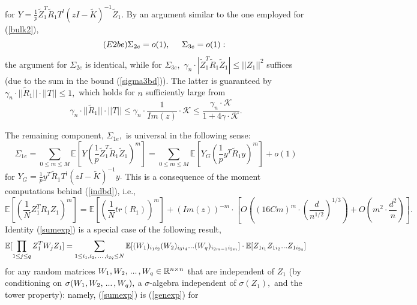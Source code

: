 \documentclass{article}
\numberwithin{equation}{section}
\begin{document}
for \(Y=\frac{1}{p}\tilde{Z}_1^T\tilde{R}_1T^l(zI-\tilde{K})^{-1}\tilde{Z}_1.\) %
By an argument similar to the one employed for (\ref{bulk2}), %
\begin{equation}\tag{\(E2be\)}\label{bulk2e}
    \Sigma_{2e}=o(1), \hspace{0.5cm} \Sigma_{3e}=o(1):
\end{equation}
the argument for \(\Sigma_{2e}\) is identical, while for \(\Sigma_{3e},\) 
\(\gamma_n \cdot |\tilde{Z}_1^T\tilde{R}_1\tilde{Z}_1| \leq ||Z_1||^2\) suffices (due to the sum in the bound (\ref{sigma3bd})). The latter is guaranteed by \(\gamma_n \cdot ||\tilde{R}_1|| \cdot ||T|| \leq 1,\) which holds for \(n\) sufficiently large from
\[\gamma_n \cdot ||\tilde{R}_1|| \cdot ||T|| \leq \gamma_n \cdot \frac{1}{Im(z)} \cdot \mathcal{K} \leq \frac{\gamma_n \cdot \mathcal{K}}{1+4\gamma \cdot \mathcal{K}}.\]
\par
The remaining component, \(\Sigma_{1e},\) is universal in the following sense:%
\begin{equation}\label{rel1}
    \Sigma_{1e}=\sum_{0 \leq m \leq M}{\mathbb{E}[Y(\frac{1}{p}\tilde{Z}_1^T\tilde{R}_1\tilde{Z}_1)^m]}=\sum_{0 \leq m \leq M}{\mathbb{E}[Y_G(\frac{1}{p}y^T\tilde{R}_1y)^m]}+o(1)
\end{equation}
for \(Y_G=\frac{1}{p}y^T\tilde{R}_1T^l(zI-\tilde{K})^{-1}y.\) This is a consequence of the moment computations behind (\ref{indbd}), i.e.,
\[\mathbb{E}[(\frac{1}{N}Z_1^TR_1Z_1)^m]=\mathbb{E}[(\frac{1}{N}tr(R_1))^m]+(Im(z))^{-m} \cdot [O((16Cm)^{m} \cdot (\frac{d}{n^{1/2}})^{1/3})+O(m^2 \cdot \frac{d^2}{n})].\]
Identity (\ref{sumexp}) is a special case of the following result,
\begin{equation}\label{genexp}
    \mathbb{E}[\prod_{1 \leq j \leq q}{Z_1^TW_jZ_1}]=\sum_{1 \leq i_1,i_2,\hspace{0.05cm}...\hspace{0.05cm},i_{2q} \leq N}{\mathbb{E}[(W_1)_{i_1i_2}(W_2)_{i_3i_4}...(W_q)_{i_{2m-1}i_{2m}}] \cdot \mathbb{E}[Z_{1i_1}Z_{1i_2}...Z_{1i_{2q}}]}
\end{equation}
for any random matrices \(W_1,W_2,\hspace{0.05cm}...\hspace{0.05cm},W_q \in \mathbb{R}^{n \times n}\) that are independent of \(Z_1\) (by conditioning on \(\sigma(W_{1},W_2,\hspace{0.05cm}...\hspace{0.05cm},W_q),\) a \(\sigma\)-algebra independent of \(\sigma(Z_1),\) and the tower property): namely, (\ref{sumexp}) is (\ref{genexp}) for 
\end{document}

